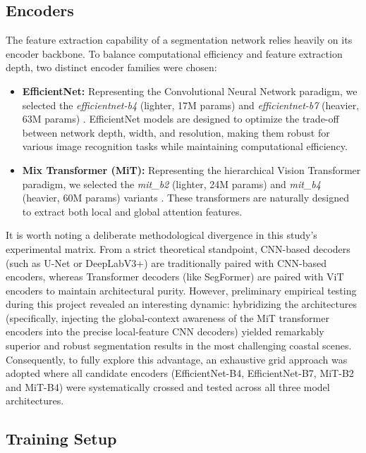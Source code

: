 ﻿\documentclass[ENG]{TFUOC}%
\begin{document}
\subsection{Encoders}

The feature extraction capability of a segmentation network relies heavily on its encoder backbone. To balance computational efficiency and feature extraction depth, two distinct encoder families were chosen:
\begin{itemize}
    \item \textbf{EfficientNet:} Representing the Convolutional Neural Network paradigm, we selected the \textit{efficientnet-b4} (lighter, 17M params) and \textit{efficientnet-b7} (heavier, 63M params) \citep{tan_efficientnet_2019}. EfficientNet models are designed to optimize the trade-off between network depth, width, and resolution, making them robust for various image recognition tasks while maintaining computational efficiency.
    \item \textbf{Mix Transformer (MiT):} Representing the hierarchical Vision Transformer paradigm, we selected the \textit{mit\_b2} (lighter, 24M params) and \textit{mit\_b4} (heavier, 60M params) variants \citep{xie_segformer_2021}. These transformers are naturally designed to extract both local and global attention features.
\end{itemize}

It is worth noting a deliberate methodological divergence in this study's experimental matrix. From a strict theoretical standpoint, CNN-based decoders (such as U-Net or DeepLabV3+) are traditionally paired with CNN-based encoders, whereas Transformer decoders (like SegFormer) are paired with ViT encoders to maintain architectural purity. However, preliminary empirical testing during this project revealed an interesting dynamic: hybridizing the architectures (specifically, injecting the global-context awareness of the MiT transformer encoders into the precise local-feature CNN decoders) yielded remarkably superior and robust segmentation results in the most challenging coastal scenes. Consequently, to fully explore this advantage, an exhaustive grid approach was adopted where all candidate encoders (EfficientNet-B4, EfficientNet-B7, MiT-B2 and MiT-B4) were systematically crossed and tested across all three model architectures.

\subsection{Training Setup}
\label{sec:training_setup}
\end{document}

